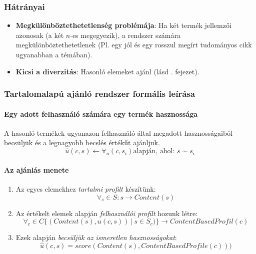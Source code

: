 \documentclass[
]{thesis-ekf}
\theoremstyle{definition}
\theoremstyle{remark}
\begin{document}
\subsubsection{Hátrányai}
\begin{itemize}
	\item \textbf{Megkülönböztethetetlenség problémája}: Ha két termék jellemzői azonosak (a két $n$-es megegyezik), a rendszer számára megkülönböztethetetlenek (Pl. egy jól és egy rosszul megírt tudományos cikk ugyanabban a témában).\cite{werner-ajanlo-rendszer}
	\item \textbf{Kicsi a diverzitás}: Hasonló elemeket ajánl (lásd . fejezet). 
\end{itemize}

\subsubsection{Tartalomalapú ajánló rendszer formális leírása}
\paragraph{Egy adott felhasználó számára egy termék hasznossága}
A hasonló termékek ugyanazon felhasználó által megadott hasznosságaiból becsüljük és a legnagyobb becslés értékűt ajánljuk.
\[\hat{u}(c,s)\leftarrow \forall_{u}(c,s_{i}) \text{alapján, ahol: } s\sim s_{i}\] \cite{werner-ajanlo-rendszer}

\paragraph{Az ajánlás menete}
\begin{enumerate}
	\item Az egyes elemekhez \emph{tartalmi profilt} készítünk:
	\[\forall_{s}\in S \colon s \rightarrow Content(s)\]
	
	\item Az értékelt elemek alapján \emph{felhasználói profilt} hozunk létre:
	\[\forall_{c} \in C \{(Content(s),u(c,s))~|~ s \in S_{c})\} \rightarrow ContentBasedProfil(c)\]
	
	\item Ezek alapján \emph{becsüljük az ismeretlen hasznosságokat}:
	\[\hat{u}(c,s) = score(Content(s), ContentBasedProfile(c)))\]
\end{enumerate}\cite{werner-ajanlo-rendszer}
\end{document}
